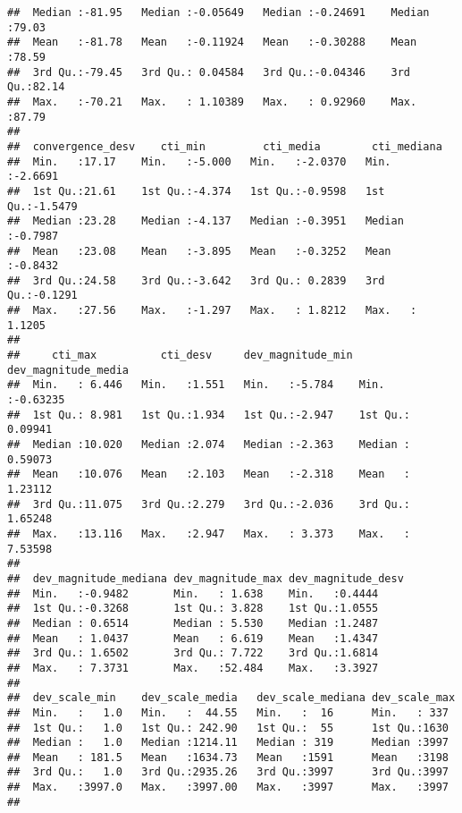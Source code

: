 \documentclass[11pt,]{article}
\begin{document}
\begin{verbatim}
##  Median :-81.95   Median :-0.05649   Median :-0.24691    Median :79.03  
##  Mean   :-81.78   Mean   :-0.11924   Mean   :-0.30288    Mean   :78.59  
##  3rd Qu.:-79.45   3rd Qu.: 0.04584   3rd Qu.:-0.04346    3rd Qu.:82.14  
##  Max.   :-70.21   Max.   : 1.10389   Max.   : 0.92960    Max.   :87.79  
##                                                                         
##  convergence_desv    cti_min         cti_media        cti_mediana     
##  Min.   :17.17    Min.   :-5.000   Min.   :-2.0370   Min.   :-2.6691  
##  1st Qu.:21.61    1st Qu.:-4.374   1st Qu.:-0.9598   1st Qu.:-1.5479  
##  Median :23.28    Median :-4.137   Median :-0.3951   Median :-0.7987  
##  Mean   :23.08    Mean   :-3.895   Mean   :-0.3252   Mean   :-0.8432  
##  3rd Qu.:24.58    3rd Qu.:-3.642   3rd Qu.: 0.2839   3rd Qu.:-0.1291  
##  Max.   :27.56    Max.   :-1.297   Max.   : 1.8212   Max.   : 1.1205  
##                                                                       
##     cti_max          cti_desv     dev_magnitude_min dev_magnitude_media
##  Min.   : 6.446   Min.   :1.551   Min.   :-5.784    Min.   :-0.63235   
##  1st Qu.: 8.981   1st Qu.:1.934   1st Qu.:-2.947    1st Qu.: 0.09941   
##  Median :10.020   Median :2.074   Median :-2.363    Median : 0.59073   
##  Mean   :10.076   Mean   :2.103   Mean   :-2.318    Mean   : 1.23112   
##  3rd Qu.:11.075   3rd Qu.:2.279   3rd Qu.:-2.036    3rd Qu.: 1.65248   
##  Max.   :13.116   Max.   :2.947   Max.   : 3.373    Max.   : 7.53598   
##                                                                        
##  dev_magnitude_mediana dev_magnitude_max dev_magnitude_desv
##  Min.   :-0.9482       Min.   : 1.638    Min.   :0.4444    
##  1st Qu.:-0.3268       1st Qu.: 3.828    1st Qu.:1.0555    
##  Median : 0.6514       Median : 5.530    Median :1.2487    
##  Mean   : 1.0437       Mean   : 6.619    Mean   :1.4347    
##  3rd Qu.: 1.6502       3rd Qu.: 7.722    3rd Qu.:1.6814    
##  Max.   : 7.3731       Max.   :52.484    Max.   :3.3927    
##                                                            
##  dev_scale_min    dev_scale_media   dev_scale_mediana dev_scale_max 
##  Min.   :   1.0   Min.   :  44.55   Min.   :  16      Min.   : 337  
##  1st Qu.:   1.0   1st Qu.: 242.90   1st Qu.:  55      1st Qu.:1630  
##  Median :   1.0   Median :1214.11   Median : 319      Median :3997  
##  Mean   : 181.5   Mean   :1634.73   Mean   :1591      Mean   :3198  
##  3rd Qu.:   1.0   3rd Qu.:2935.26   3rd Qu.:3997      3rd Qu.:3997  
##  Max.   :3997.0   Max.   :3997.00   Max.   :3997      Max.   :3997  
##                                                                     

\end{verbatim}
\end{document}
